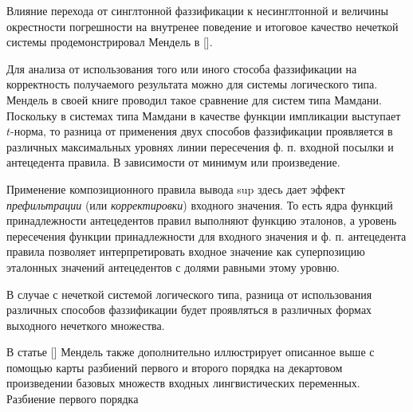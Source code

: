 Влияние перехода от синглтонной фаззификации к несинглтонной и величины окрестности погрешности на внутренее поведение и итоговое качество нечеткой системы продемонстрировал Мендель в []. 

Для анализа  от использования того или иного стособа фаззификации на корректность получаемого результата можно для системы логического типа. Мендель в своей книге проводил такое сравнение для систем типа Мамдани. Поскольку в системах типа Мамдани в качестве функции импликации выступает $t$-норма, то разница от применения двух способов фаззификации проявляется в различных максимальных уровнях линии пересечения ф. п. входной посылки и антецедента правила. В зависимости от минимум или произведение. 

Применение композиционного правила вывода sup здесь дает эффект \textit{префильтрации} (или \textit{корректировки}) входного значения. То есть ядра функций принадлежности антецедентов правил выполняют функцию эталонов, а уровень пересечения функции принадлежности для входного значения и ф. п. антецедента правила позволяет интерпретировать входное значение как суперпозицию эталонных значений антецедентов с долями равными этому уровню.

В случае с нечеткой системой логического типа, разница от использования различных способов фаззификации будет проявляться в различных формах выходного нечеткого множества. 

В статье [] Мендель также дополнительно иллюстрирует описанное выше с помощью карты разбиений первого и второго порядка на декартовом произведении базовых множеств входных лингвистических переменных. Разбиение первого порядка 



